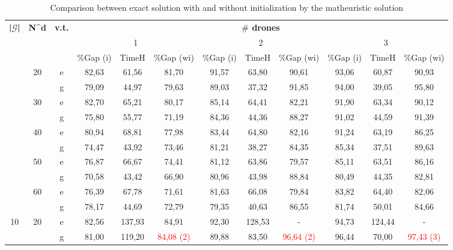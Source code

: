 \begin{table}[!h]
\caption{Comparison between exact solution with and without initialization by the matheuristic solution  }
\centering
\tiny
\begin{tabular}{|c|c|c|c c c c c c c c c|}
\hline
\multirow{3}{*}{\textbf{|$\mathcal{G}$|}} & \multirow{3}{*}{\textbf{N^d}}  & \multirow{3}{*}{\textbf{v.t.}} & \multicolumn{9}{|c|}{\textbf{$\#$ drones}} \\
\cline{4-12}
& & & \multicolumn{3}{c|}{1} & \multicolumn{3}{c|}{2} & \multicolumn{3}{c|}{3}\\
\cline{4-12}
& & &  $\%$Gap (i) & TimeH & $\%$Gap (wi) & $\%$Gap (i) & TimeH & $\%$Gap (wi)& $\%$Gap (i) & TimeH & $\%$Gap (wi)\\
\hline
\multirow{5}{*}{\midrule 5} & \multirow{2}{*}{20} & e & 82,63 & 61,56 & 81,70 & 91,57 &	63,80 &	90,61 &	93,06 &	60,87 &	90,93\\
&  & g & 79,09 & 44,97 & 79,63 & 89,03 & 37,32 & 91,85 & 94,00 & 39,05 & 95,80\\
\cline{2-12}
& \multirow{2}{*}{30} & e & 82,70 &	65,21 &	80,17 &	85,14 &	64,41 &	82,21 &	91,90 &	63,34 &	90,12\\
& & g & 75,80 &	55,77 &	71,19 &	84,36 &	44,36 &	88,27 &	91,02 &	44,59 &	91,39\\
\cline{2-12}
& \multirow{2}{*}{40} & e & 80,94 &	68,81 &	77,98 &	83,44 &	64,80 &	82,16 &	91,24 &	63,19 &	86,25\\
& & g & 74,47 &	43,92 &	73,46 &	81,21 &	38,27 &	84,35 &	85,34 &	37,51 &	89,63\\
\cline{2-12}
& \multirow{2}{*}{50} & e & 76,87 &	66,67 &	74,41 &	81,12 &	63,86 &	79,57 &	85,11 &	63,51 &	86,16\\
& & g & 70,58 &	43,42 &	66,90 &	80,96 &	43,98 &	88,84 &	80,49 &	44,35 &	82,81\\
\cline{2-12}
& \multirow{2}{*}{60} & e & 76,39 &	67,78 &	71,61 &	81,63 &	66,08 &	79,84 &	83,82 &	64,40 &	82,06\\
& & g & 78,17 &	44,69 &	72,79 &	79,35 &	40,63 &	86,55 &	81,74 &	50,01 &	84,66\\
\hline
\multirow{5}{*}{10} & \multirow{2}{*}{20} & e & 82,56 &	137,93 &	84,91 &	92,30 &	128,53 & - & 94,73 & 124,44 & -\\
&  & g & 81,00 & 119,20 & \textcolor{red}{84,08 (2)} & 89,88 & 83,50 & \textcolor{red}{96,64 (2)} & 96,44 & 70,00 & \textcolor{red}{97,43 (3)}\\

\end{tabular}
\end{table}
